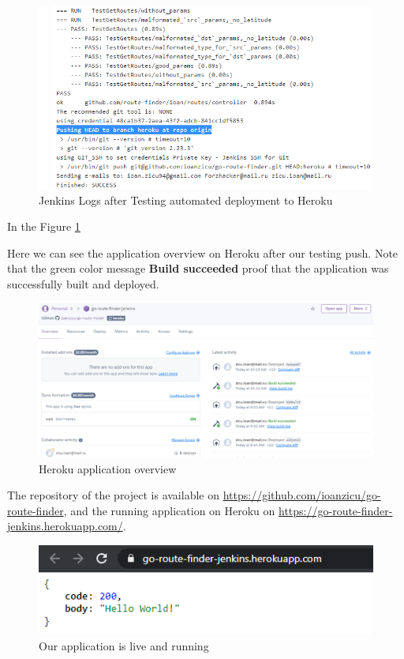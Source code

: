 \documentclass[12pt,a4paper,twoside]{article}
\begin{document}
\begin{figure}[H]
    \centering
        \includegraphics[width=14cm]{images-git-heroku/jenkins-test-logs.png}
        \caption{Jenkins Logs after Testing automated deployment to Heroku}
        \label{fig:jenkinsLogs}
\end{figure}


In the Figure \ref{fig:jenkinsLogs}

Here we can see the application overview on Heroku after our testing push. Note that the green color message \textbf{Build succeeded} proof that the application was successfully built and deployed. 

\begin{figure}[H]
    \centering
        \includegraphics[width=15cm]{images-git-heroku/heroku-app-overview.png}
        \caption{Heroku application overview}
\end{figure}


The repository of the project is available on \url{https://github.com/ioanzicu/go-route-finder}, and the running application on Heroku on \url{https://go-route-finder-jenkins.herokuapp.com/}.


\begin{figure}[H]
    \centering
        \includegraphics[width=12cm]{images-git-heroku/deployed-app.png}
        \caption{Our application is live and running}
\end{figure}
\end{document}
